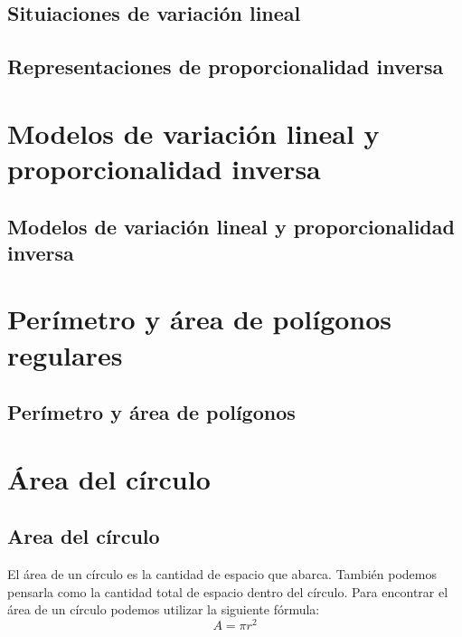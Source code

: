 \documentclass[11pt]{book}
\begin{document}
\subsection{Situiaciones de variación lineal}
\subsection{Representaciones de proporcionalidad inversa}

\section{Modelos de variación lineal y proporcionalidad inversa}
\subsection{Modelos de variación lineal y proporcionalidad inversa}

\section{Per\'imetro y \'area de pol\'igonos regulares}
\subsection{Per\'imetro y \'area de pol\'igonos}

\section{\'Area del c\'irculo}


\subsection{Area del c\'irculo}
El área de un círculo es la cantidad de espacio que abarca. También podemos pensarla como la cantidad total de espacio dentro del círculo.
Para encontrar el área de un círculo podemos utilizar la siguiente fórmula:
\[A=\pi r^2\]
\end{document}
